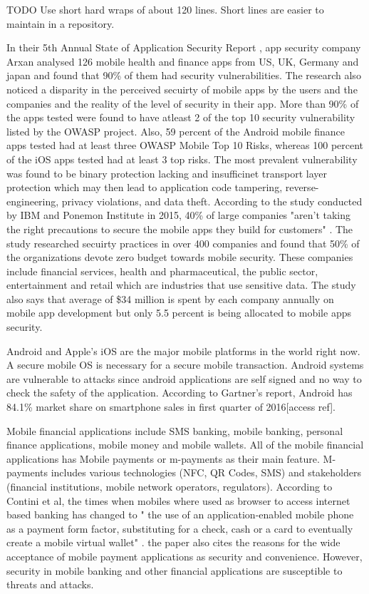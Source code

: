 \documentclass{mproj}
\begin{document}
TODO Use short hard wraps of about 120 lines.  Short lines are easier to maintain in a repository.

In their 5th Annual State of Application Security Report \cite{arxan}, app security company Arxan analysed 126 mobile
health and finance apps from US, UK, Germany and japan and found that 90\% of them had security vulnerabilities. The
research also noticed a disparity in the perceived secuirty of mobile apps by the users and the companies and the
reality of the level of security in their app. More than 90\% of the apps tested were found to have atleast 2 of the top
10 security vulnerability listed by the OWASP project. Also, 59 percent of the Android mobile finance apps tested had at
least three OWASP Mobile Top 10 Risks, whereas 100 percent of the iOS apps tested had at least 3 top risks. The most
prevalent vulnerability was found to be binary protection lacking and insufficinet transport layer protection which may
then lead to application code tampering, reverse-engineering, privacy violations, and data theft. According to the study
conducted by IBM and Ponemon Institute in 2015, 40\% of large companies "aren’t taking the right precautions to secure
the mobile apps they build for customers" \cite{ibm}. The study researched secuirty practices in over 400 companies and
found that 50\% of the organizations devote zero budget towards mobile security. These companies include financial
services, health and pharmaceutical, the public sector, entertainment and retail which are industries that use sensitive
data. The study also says that average of \$34 million is spent by each company annually on mobile app development but
only 5.5 percent is being allocated to mobile apps security.

Android and Apple's iOS are the major mobile platforms in the world right now. A secure mobile OS is necessary for a secure mobile transaction. Android systems are vulnerable to attacks since android applications are self signed and no way to check the safety of the application. 
According to Gartner's report, Android has 84.1\% market share on smartphone sales in first quarter of 2016[access ref].

Mobile financial applications include SMS banking, mobile banking, personal finance applications, mobile money and mobile wallets. All of the mobile financial applications has Mobile payments or m-payments as their main feature. M-payments includes various technologies (NFC, QR Codes, SMS) and stakeholders (financial institutions, mobile network operators, regulators). According to Contini et al\cite{contini2011}, the times when mobiles where used as browser to access internet based banking has changed to " the use of an application-enabled mobile phone as a payment form factor, substituting for a check, cash or a card to eventually create a mobile virtual wallet" \cite{contini2011}. the paper also cites the reasons for the wide acceptance of mobile payment applications as security and convenience. However, security in mobile banking and other financial applications are susceptible to threats and attacks.
\end{document}
